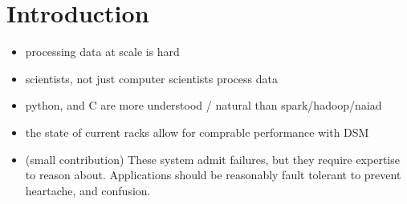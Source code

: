 \section{Introduction} 
\label{sec:intro}
\begin{itemize}
        \item processing data at scale is hard
        \item scientists, not just computer scientists process data
        \item python, and C are more understood / natural than spark/hadoop/naiad
        \item the state of current racks allow for comprable performance with DSM
        \item (small contribution) These system admit failures, but they require expertise to reason about. Applications should be reasonably fault tolerant to prevent heartache, and confusion.
\end{itemize}

